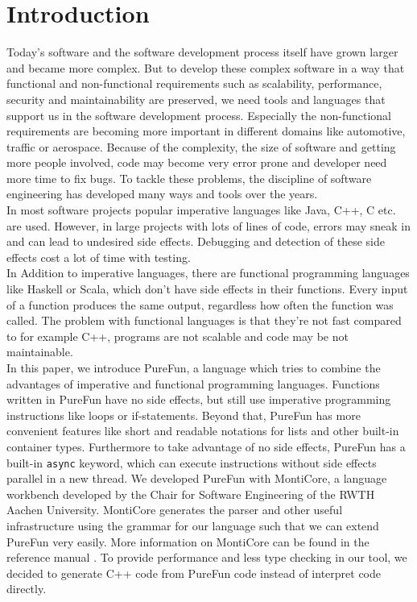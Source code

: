 \section{Introduction}


Today's software and the software development process itself have grown larger and became more complex. But to develop these complex software in a way that functional and non-functional requirements such as scalability, performance, security and maintainability are preserved, we need tools and languages that support us in the software development process.  Especially the non-functional requirements are becoming more important in different domains like automotive, traffic or aerospace. Because of the complexity, the size of software and getting more people involved, code may become very error prone and developer need more time to fix bugs. To tackle these problems, the discipline of software engineering has developed many ways and tools over the years.\\
In most software projects popular imperative languages like Java, C++, C etc. are used. However, in large projects with lots of lines of code, errors may sneak in and can lead to undesired side effects. Debugging and detection of these side effects cost a lot of time with testing.\\
In Addition to imperative languages, there are functional programming languages like Haskell or Scala, which don't have side effects in their functions. Every input of a function produces the same output, regardless how often the function was called. The problem with functional languages is that they're not fast compared to for example C++, programs are not scalable and code may be not maintainable.\\
In this paper, we introduce PureFun, a language which tries to combine the advantages of imperative and functional programming languages. Functions written in PureFun have no side effects, but still use imperative programming instructions like loops or if-statements. Beyond that, PureFun has more convenient features like short and readable notations for lists and other built-in container types. Furthermore to take advantage of no side effects, PureFun has a built-in \texttt{async}{} keyword, which can execute instructions without side effects parallel in a new thread. We developed PureFun with MontiCore, a language workbench developed by the Chair for Software Engineering of the RWTH Aachen University. MontiCore generates the parser and other useful infrastructure using the grammar for our language such that we can extend PureFun very easily. More information on MontiCore can be found in the reference manual \cite{monticore17:manual}. To provide performance and less type checking in our tool, we decided to generate C++ code from PureFun code instead of interpret code directly.\\
